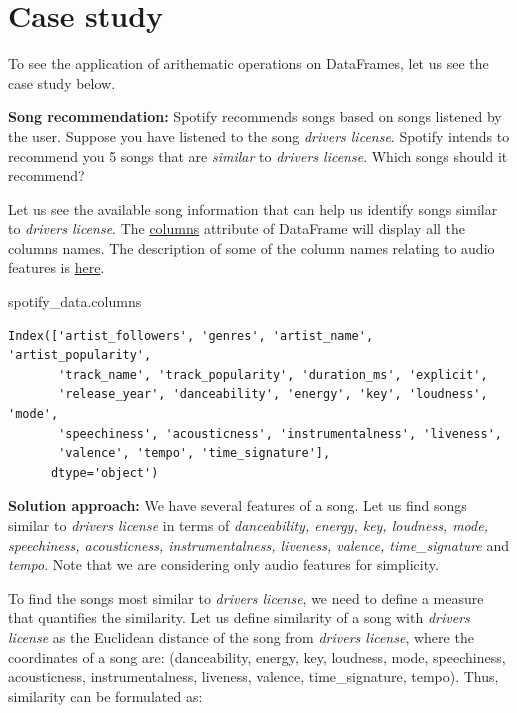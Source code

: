 \documentclass[
  letterpaper,
  DIV=11,
  numbers=noendperiod]{scrreprt}
\newenvironment{Shaded}{\begin{snugshade}}{\end{snugshade}}
\newcommand{\NormalTok}[1]{\textcolor[rgb]{0.00,0.23,0.31}{#1}}
\begin{document}
\hypertarget{case-study}{%
\section{Case study}\label{case-study}}

To see the application of arithematic operations on DataFrames, let us
see the case study below.

\textbf{Song recommendation:} Spotify recommends songs based on songs
listened by the user. Suppose you have listened to the song
\emph{drivers license}. Spotify intends to recommend you 5 songs that
are \emph{similar} to \emph{drivers license}. Which songs should it
recommend?

Let us see the available song information that can help us identify
songs similar to \emph{drivers license}. The
\href{https://pandas.pydata.org/docs/reference/api/pandas.DataFrame.columns.html}{columns}
attribute of DataFrame will display all the columns names. The
description of some of the column names relating to audio features is
\href{https://developer.spotify.com/documentation/web-api/reference/\#/operations/get-audio-features}{here}.

\begin{Shaded}
\begin{Highlighting}[]
\NormalTok{spotify\_data.columns}
\end{Highlighting}
\end{Shaded}

\begin{verbatim}
Index(['artist_followers', 'genres', 'artist_name', 'artist_popularity',
       'track_name', 'track_popularity', 'duration_ms', 'explicit',
       'release_year', 'danceability', 'energy', 'key', 'loudness', 'mode',
       'speechiness', 'acousticness', 'instrumentalness', 'liveness',
       'valence', 'tempo', 'time_signature'],
      dtype='object')
\end{verbatim}

\textbf{Solution approach:} We have several features of a song. Let us
find songs similar to \emph{drivers license} in terms of
\emph{danceability, energy, key, loudness, mode, speechiness,
acousticness, instrumentalness, liveness, valence, time\_signature} and
\emph{tempo}. Note that we are considering only audio features for
simplicity.

To find the songs most similar to \emph{drivers license}, we need to
define a measure that quantifies the similarity. Let us define
similarity of a song with \emph{drivers license} as the Euclidean
distance of the song from \emph{drivers license}, where the coordinates
of a song are: (danceability, energy, key, loudness, mode, speechiness,
acousticness, instrumentalness, liveness, valence, time\_signature,
tempo). Thus, similarity can be formulated as:
\end{document}
